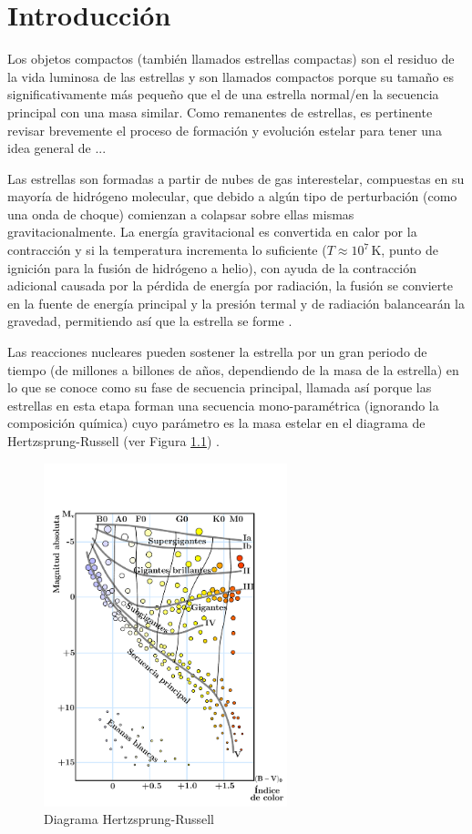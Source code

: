 \chapter{Introducción}

Los objetos compactos (también llamados estrellas compactas) son el residuo de la vida luminosa de las estrellas y son llamados compactos porque su tamaño es significativamente más pequeño que el de una estrella normal/en la secuencia principal con una masa similar. Como remanentes de estrellas, es pertinente revisar brevemente el proceso de formación y evolución estelar para tener una idea general de ...  

Las estrellas son formadas a partir de nubes de gas interestelar, compuestas en su mayoría de hidrógeno molecular, que debido a algún tipo de perturbación (como una onda de choque) comienzan a colapsar sobre ellas mismas gravitacionalmente. La energía gravitacional es convertida en calor por la contracción y si la temperatura incrementa lo suficiente ($T \approx 10^7 \, \si{\kelvin}$, punto de ignición para la fusión de hidrógeno a helio), con ayuda de la contracción adicional causada por la pérdida de energía por radiación, la fusión se convierte en la fuente de energía principal y la presión termal y de radiación balancearán la gravedad, permitiendo así que la estrella se forme \cite{Glendenning2000CompactStars}.

Las reacciones nucleares pueden sostener la estrella por un gran periodo de tiempo (de millones a billones de años, dependiendo de la masa de la estrella) en lo que se conoce como su fase de secuencia principal, llamada así porque las estrellas en esta etapa forman una secuencia mono-paramétrica (ignorando la composición química) cuyo parámetro es la masa estelar en el diagrama de Hertzsprung-Russell (ver Figura \ref{HR}) \cite{Scilla2016IntroductionEvolution}. 


\begin{figure}[H]
    \centering
    \includegraphics[width=200pt]{figures/H-R_diagram.pdf}
    \caption{Diagrama Hertzsprung-Russell}
    \label{HR}
\end{figure}

